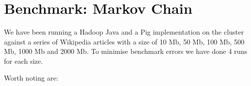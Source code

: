 \section{Benchmark: Markov Chain}

We have been running a Hadoop Java and a Pig implementation on the cluster against a series of Wikipedia articles with a size of 10 Mb, 50 Mb, 100 Mb, 500 Mb, 1000 Mb and 2000 Mb. To minimise benchmark errors we have done 4 runs for each size.


Worth noting are:        